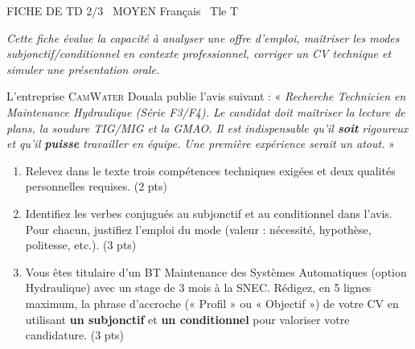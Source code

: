 \documentclass[11pt]{article}
\begin{document}
\begin{tcolorbox}[enhanced,colback=popink,colframe=popink,arc=10pt,boxrule=0pt,left=12pt,right=12pt,top=9pt,bottom=9pt]
{\color{white}\popxbold\small FICHE DE TD 2/3 \textbullet\ MOYEN \hfill Français \textbullet\ Tle T\par}
\end{tcolorbox}
\vspace{4pt}
\emph{Cette fiche évalue la capacité à analyser une offre d'emploi, maîtriser les modes subjonctif/conditionnel en contexte professionnel, corriger un CV technique et simuler une présentation orale.}

\begin{exercice}
L'entreprise \textsc{CamWater} Douala publie l'avis suivant : « \emph{Recherche Technicien en Maintenance Hydraulique (Série F3/F4). Le candidat doit maîtriser la lecture de plans, la soudure TIG/MIG et la GMAO. Il est indispensable qu'il \textbf{soit} rigoureux et qu'il \textbf{puisse} travailler en équipe. Une première expérience serait un atout.} »\\

\begin{enumerate}
    \item Relevez dans le texte trois compétences techniques exigées et deux qualités personnelles requises. (2 pts)
    \item Identifiez les verbes conjugués au subjonctif et au conditionnel dans l'avis. Pour chacun, justifiez l'emploi du mode (valeur : nécessité, hypothèse, politesse, etc.). (3 pts)
    \item Vous êtes titulaire d'un BT Maintenance des Systèmes Automatiques (option Hydraulique) avec un stage de 3 mois à la SNEC. Rédigez, en 5 lignes maximum, la phrase d'accroche (« Profil » ou « Objectif ») de votre CV en utilisant \textbf{un subjonctif} et \textbf{un conditionnel} pour valoriser votre candidature. (3 pts)
\end{enumerate}
\end{exercice}
\end{document}
